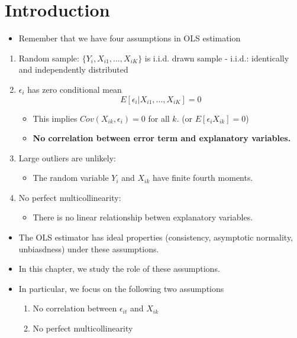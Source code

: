 \documentclass[]{book}
\providecommand{\tightlist}{%
  \setlength{\itemsep}{0pt}\setlength{\parskip}{0pt}}
\begin{document}
\section{Introduction}\label{introduction-1}

\begin{itemize}
\tightlist
\item
  Remember that we have four assumptions in OLS estimation
\end{itemize}

\begin{enumerate}
\def\labelenumi{\arabic{enumi}.}
\tightlist
\item
  Random sample: \(\{ Y_i , X_{i1}, \ldots, X_{iK} \}\) is i.i.d. drawn
  sample - i.i.d.: identically and independently distributed
\item
  \(\epsilon_i\) has zero conditional mean \[
    E[ \epsilon_i | X_{i1}, \ldots, X_{iK}] = 0
    \]

  \begin{itemize}
  \tightlist
  \item
    This implies \(Cov(X_{ik}, \epsilon_i) = 0\) for all \(k\). (or
    \(E[\epsilon_i X_{ik}] = 0\))
  \item
    \textbf{No correlation between error term and explanatory
    variables.}
  \end{itemize}
\item
  Large outliers are unlikely:

  \begin{itemize}
  \tightlist
  \item
    The random variable \(Y_i\) and \(X_{ik}\) have finite fourth
    moments.
  \end{itemize}
\item
  No perfect multicollinearity:

  \begin{itemize}
  \tightlist
  \item
    There is no linear relationship betwen explanatory variables.
  \end{itemize}
\end{enumerate}

\begin{itemize}
\tightlist
\item
  The OLS estimator has ideal properties (consistency, asymptotic
  normality, unbiasdness) under these assumptions.
\item
  In this chapter, we study the role of these assumptions.
\item
  In particular, we focus on the following two assumptions

  \begin{enumerate}
  \def\labelenumi{\arabic{enumi}.}
  \tightlist
  \item
    No correlation between \(\epsilon_{it}\) and \(X_{ik}\)
  \item
    No perfect multicollinearity
  \end{enumerate}
\end{itemize}
\end{document}
